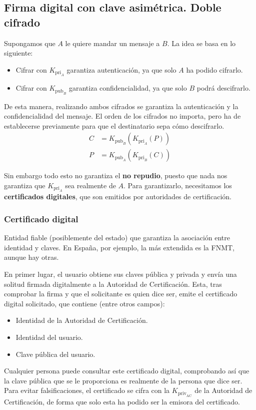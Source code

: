 \subsection{Firma digital con clave asimétrica. Doble cifrado}

Supongamos que $A$ le quiere mandar un mensaje a $B$. La idea se basa en lo siguiente:
\begin{itemize}
    \item Cifrar con $K_{\text{pri}_A}$ garantiza autenticación, ya que solo $A$ ha podido cifrarlo.
    \item Cifrar con $K_{\text{pub}_B}$ garantiza confidencialidad, ya que solo $B$ podrá descifrarlo.
\end{itemize}
De esta manera, realizando ambos cifrados se garantiza la autenticación y la confidencialidad del mensaje. El orden de los cifrados no importa, pero ha de establecerse previamente para que el destinatario sepa cómo descifrarlo.
\begin{align*}
    C&=K_{\text{pub}_B}\left(K_{\text{pri}_A}(P)\right)\\
    P&=K_{\text{pub}_A}\left(K_{\text{pri}_B}(C)\right)
\end{align*}

Sin embargo todo esto no garantiza el \textbf{no repudio}, puesto que nada nos garantiza que $K_{\text{pri}_A}$ sea realmente de $A$. Para garantizarlo, necesitamos los \textbf{certificados digitales}, que son emitidos por autoridades de certificación.


\subsubsection{Certificado digital}

\begin{definicion}
    Entidad fiable (posiblemente del estado) que garantiza la asociación entre identidad y claves. En España, por ejemplo, la más extendida es la \acrshort{FNMT}, aunque hay otras.
\end{definicion}

En primer lugar, el usuario obtiene sus claves pública y privada y envía una solitud firmada digitalmente a la Autoridad de Certificación. Esta, tras comprobar la firma y que el solicitante es quien dice ser, emite el certificado digital solicitado, que contiene (entre otros campos):
\begin{itemize}
    \item Identidad de la Autoridad de Certificación.
    \item Identidad del usuario.
    \item Clave pública del usuario.
\end{itemize}
Cualquier persona puede consultar este certificado digital, comprobando así que la clave pública que se le proporciona es realmente de la persona que dice ser. Para evitar falsificaciones, el certificado se cifra con la $K_{\text{priv}_\text{AC}}$ de la Autoridad de Certificación, de forma que solo esta ha podido ser la emisora del certificado.\\

